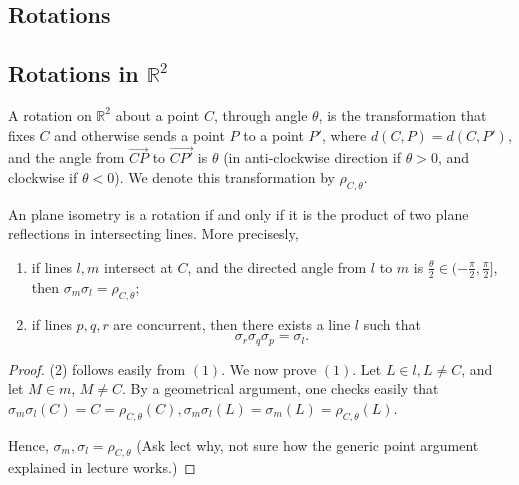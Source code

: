 \subsection{Rotations}

\subsection{Rotations in \( \mathbb{R}^{2} \)}

\begin{definition}
 A rotation on \( \mathbb{R}^{2} \) about a point \( C \), through angle \( \theta   \), is the 
 transformation that fixes \( C \) and otherwise sends a point \( P \) to a point \( P' \),
where \( d(C,P) = d(C, P') \), and the angle from \( \overrightarrow{CP}  \) to \( \overrightarrow{CP'} \) is \( \theta  \) (in anti-clockwise direction
if \( \theta >0 \), and clockwise if \( \theta <0 \)). We denote this transformation by \( \rho_{C, \theta } \).
\end{definition}


\begin{theorem}
 An plane isometry is a rotation if and only if it is the product of two plane reflections in intersecting lines.
 More precisesly,
 \begin{enumerate}
   \item if lines \( l,m \) intersect at \( C \), and the directed angle from \( l \) to \( m \) is 
   \( \frac{\theta}{2} \in (-\frac{\pi}{2}, \frac{\pi}{2}] \), then \( \sigma_{m} \sigma_{l} = \rho_{C,\theta} \);
 \item if lines \( p, q, r \) are concurrent, then there exists a line \( l \) such that 
   \[
    \sigma_{r} \sigma_{q} \sigma_{p} = \sigma_{l}
   .\] 
 \end{enumerate}
\end{theorem}

\begin{proof}
  (2) follows easily from \( \left(1  \right) \). We now prove \( \left(1  \right) \). 
  Let \( L \in  l, L \neq C \), and let \( M \in m \), \( M \neq C \). By a geometrical argument, one checks easily that
  \( \sigma_{m} \sigma_{l} \left(C  \right) = C = \rho_{C,\theta }\left( C \right), \sigma_{m} \sigma_{l}\left(L  \right) = \sigma_{m} \left( L \right) = \rho_{C,\theta } \left(L  \right) \).


  Hence, \( \sigma_{m}, \sigma_{l} = \rho_{C, \theta} \) (Ask lect why, not sure how the generic point argument explained in lecture works.)
\end{proof}

